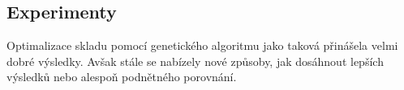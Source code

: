 \begin{itemize}
\end{itemize}



\subsection{Experimenty}
Optimalizace skladu pomocí genetického algoritmu jako taková přinášela velmi dobré výsledky. Avšak stále se nabízely nové způsoby, jak dosáhnout lepších výsledků nebo alespoň podnětného porovnání.

